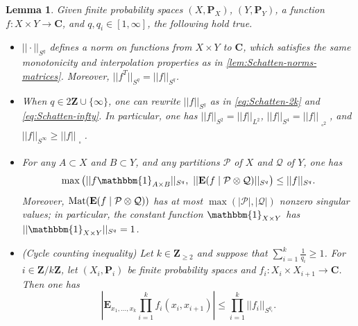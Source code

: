 \documentclass[reqno,11pt]{amsart}
\newtheorem{lemma}[theorem]{Lemma}
\theoremstyle{definition}
\theoremstyle{remark}
\numberwithin{equation}{section}
\newcommand{\Z}{\mathbf{Z}}
\newcommand{\C}{\mathbf{C}}
\renewcommand{\P}{\mathbf{P}}
\newcommand{\E}{\mathbf{E}}
\newcommand{\mP}{\mathcal{P}}
\newcommand{\mQ}{\mathcal{Q}}
\newcommand{\one}{\mathbbm{1}}
\newcommand{\sq}{_{\substack{ \\ \square}}}
\newcommand{\gow}{_{\substack{ \\ \square^2}}}
\newcommand{\Mat}{\textnormal{Mat}}
\begin{document}
\begin{lemma} \label{lem:Schatten-norms-functions}
Given finite probability spaces $(X, \P_X)$, $(Y, \P_Y)$, a function $f : X \times Y \to \C$, and $q, q_i \in [1, \infty]$, the following hold true.
\begin{itemize}
    \item[$(i)$.] $|| \cdot ||_{S^q}$ defines a norm on functions from $X \times Y$ to $\C$, which satisfies the same monotonicity and interpolation properties as in \cref{lem:Schatten-norms-matrices}. Moreover, $||f^T||_{S^q} = ||f||_{S^q}$.
    \item[$(ii)$.] When $q \in 2\Z \cup \{\infty\}$, one can rewrite $||f||_{S^q}$ as in \cref{eq:Schatten-2k} and \cref{eq:Schatten-infty}. In particular, one has $||f||_{S^2} = ||f||_{L^2}$, $||f||_{S^4} = ||f||\gow$, and $||f||_{S^\infty} \ge ||f||\sq$.
    \item[$(iii)$.] For any $A \subset X$ and $B \subset Y$, and any partitions $\mP$ of $X$ and $\mQ$ of $Y$, one has
    \[
        \max \left(||f \one_{A \times B}||_{S^q} ,\ ||\E(f \mid \mP \otimes \mQ)||_{S^q}\right) \le ||f||_{S^q}.
    \]
    Moreover, $\Mat(\E(f \mid \mP \otimes \mQ))$ has at most $\max(|\mP|, |\mQ|)$ nonzero singular values; in particular, the constant function $\one_{X \times Y}$ has $||\one_{X \times Y}||_{S^q} = 1$.
    \item[$(iv)$.] \emph{(Cycle counting inequality)}
    Let $k \in \Z_{\ge 2}$ and suppose that $\sum_{i=1}^k \frac{1}{q_i} \ge 1$.
    For $i \in \Z/k\Z$, let $(X_i, \P_i)$ be finite probability spaces and $f_i : X_i \times X_{i+1} \to \C$. Then one has
    \[
        \left\vert \E_{x_1, \ldots, x_k} \prod_{i=1}^k f_i(x_i, x_{i+1}) \right\vert 
        \le 
        \prod_{i=1}^k ||f_i||_{S^{q_i}}.
    \]
\end{itemize}
\end{lemma}
\end{document}
